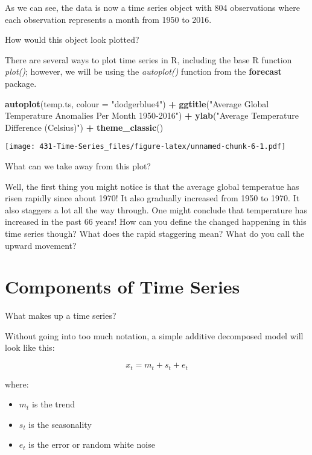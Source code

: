 \documentclass[
]{book}
\newenvironment{Shaded}{\begin{snugshade}}{\end{snugshade}}
\newcommand{\DataTypeTok}[1]{\textcolor[rgb]{0.13,0.29,0.53}{#1}}
\newcommand{\KeywordTok}[1]{\textcolor[rgb]{0.13,0.29,0.53}{\textbf{#1}}}
\newcommand{\NormalTok}[1]{#1}
\newcommand{\OperatorTok}[1]{\textcolor[rgb]{0.81,0.36,0.00}{\textbf{#1}}}
\newcommand{\StringTok}[1]{\textcolor[rgb]{0.31,0.60,0.02}{#1}}
\providecommand{\tightlist}{%
  \setlength{\itemsep}{0pt}\setlength{\parskip}{0pt}}
\begin{document}
As we can see, the data is now a time series object with 804 observations where each observation represents a month from 1950 to 2016.

How would this object look plotted?

There are several ways to plot time series in R, including the base R function \emph{plot()}; however, we will be using the \emph{autoplot()} function from the \textbf{forecast} package.

\begin{Shaded}
\begin{Highlighting}[]
\KeywordTok{autoplot}\NormalTok{(temp.ts, }\DataTypeTok{colour =} \StringTok{"dodgerblue4"}\NormalTok{) }\OperatorTok{+}
\StringTok{  }\KeywordTok{ggtitle}\NormalTok{(}\StringTok{"Average Global Temperature Anomalies Per Month 1950-2016"}\NormalTok{) }\OperatorTok{+}\StringTok{ }
\StringTok{  }\KeywordTok{ylab}\NormalTok{(}\StringTok{"Average Temperature Difference (Celsius)"}\NormalTok{) }\OperatorTok{+}\StringTok{ }
\StringTok{  }\KeywordTok{theme_classic}\NormalTok{()}
\end{Highlighting}
\end{Shaded}

\texttt{[image: 431-Time-Series\_files/figure-latex/unnamed-chunk-6-1.pdf]}

What can we take away from this plot?

Well, the first thing you might notice is that the average global temperatue has risen rapidly since about 1970! It also gradually increased from 1950 to 1970. It also staggers a lot all the way through. One might conclude that temperature has increased in the past 66 years! How can you define the changed happening in this time series though? What does the rapid staggering mean? What do you call the upward movement?

\hypertarget{components-of-time-series}{%
\section{Components of Time Series}\label{components-of-time-series}}

What makes up a time series?

Without going into too much notation, a simple additive decomposed model will look like this:

\[x_{t} = m_{t} + s_{t} + e_{t}\]

where:

\begin{itemize}
\tightlist
\item
  \(m_t\) is the trend
\item
  \(s_t\) is the seasonality
\item
  \(e_t\) is the error or random white noise
\end{itemize}
\end{document}
